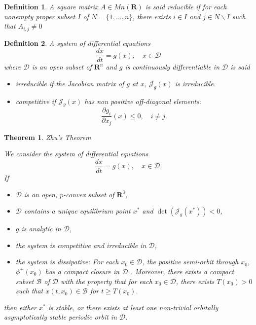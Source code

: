 \documentclass{article}
\newtheorem{theorem}{Theorem}
\newtheorem{definition}{Definition}
\begin{document}
\begin{definition}\cite{kaszkurewicz_matrix_2012}
A square matrix $A \in Mn (\mathbf{R})$ is said reducible if 
for each nonempty proper subset $I$ of $N = \{1, ..., n\}$, there exists $i \in I$ and $j \in N\backslash I$ such that $A_{i,j} \neq 0$
\end{definition}


\begin{definition} \label{def:monotone}\cite{smith_monotone_1995} A system of differential equations
$$ \dfrac{d x}{dt} = g(x), \quad x \in \mathcal{D}$$
where $\mathcal{D}$ is an open subset of $\mathbf{R}^n$ and $g$ is continuously differentiable in $\mathcal{D}$ is said 

\begin{itemize}
\item irreducible if the Jacobian matrix of $g$ at $x$, $\mathcal{J}_g(x)$ is irreducible.
\item competitive if $\mathcal{J}_g(x)$ has non positive off-diagonal elements:
$$ \dfrac{\partial g_i}{\partial x_j}(x) \leq 0, \quad i \neq j.
$$
\end{itemize}
\end{definition}



\begin{theorem} Zhu's Theorem \cite{zhu_stable_1994} \label{theorem:Zhu}

We consider the system of differential equations
$$
\dfrac{dx}{dt} = g(x), \quad x \in \mathcal{D}.
$$
If
\begin{itemize}
\item $\mathcal{D}$ is an open, $p$-convex subset of $\mathbf{R}^3$,
\item $\mathcal{D}$ contains a unique equilibrium point $x^*$ and $\det(\mathcal{J}_g(x^*)) < 0$,
\item $g$ is analytic in $\mathcal{D}$,
\item the system is competitive and irreducible in $\mathcal{D}$,
\item the system is dissipative: For each $x_0 \in \mathcal{D}$, the positive semi-orbit through $x_0$, $\phi^+(x_0)$ has a compact closure in $\mathcal{D}$ . Moreover, there exists a compact subset $\mathcal{B}$ of $\mathcal{D}$ with the property that for each $x_0 \in \mathcal{D}$, there exists $T(x_0) > 0$ such that $x(t, x_0) \in \mathcal{B}$ for $t \geq T(x_0)$.
\end{itemize}

then either $x^*$ is stable, or there exists at least one non-trivial orbitally asymptotically stable  periodic orbit in $\mathcal{D}$.
\end{theorem}
\end{document}
